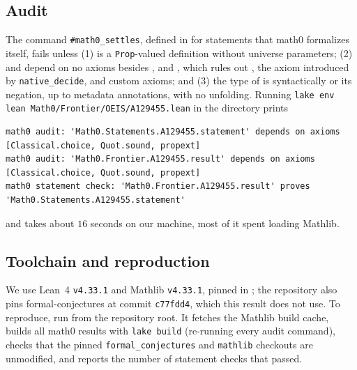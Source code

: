 \documentclass[11pt]{amsart}
\theoremstyle{plain}
\theoremstyle{definition}
\begin{document}
\subsection*{Audit}
The command \texttt{\#math0\_settles}, defined in  for statements that math0 formalizes itself, fails unless (1)  is a \texttt{Prop}-valued definition without universe parameters; (2)  and  depend on no axioms besides ,  and , which rules out , the axiom  introduced by \texttt{native\_decide}, and custom axioms; and (3) the type of  is syntactically  or its negation, up to metadata annotations, with no unfolding. Running \texttt{lake env lean Math0/Frontier/OEIS/A129455.lean} in the directory  prints
\begin{lstlisting}[basicstyle=\ttfamily\scriptsize]
math0 audit: 'Math0.Statements.A129455.statement' depends on axioms [Classical.choice, Quot.sound, propext]
math0 audit: 'Math0.Frontier.A129455.result' depends on axioms [Classical.choice, Quot.sound, propext]
math0 statement check: 'Math0.Frontier.A129455.result' proves 'Math0.Statements.A129455.statement'
\end{lstlisting}
and takes about $16$ seconds on our machine, most of it spent loading Mathlib.

\subsection*{Toolchain and reproduction}
We use Lean~4 \cite{Lean4} \texttt{v4.33.1} and Mathlib \cite{Mathlib} \texttt{v4.33.1}, pinned in ; the repository also pins formal-conjectures \cite{FC} at commit \texttt{c77fdd4}, which this result does not use. To reproduce, run  from the repository root. It fetches the Mathlib build cache, builds all math0 results with \texttt{lake build} (re-running every audit command), checks that the pinned \texttt{formal\_conjectures} and \texttt{mathlib} checkouts are unmodified, and reports the number of statement checks that passed.
\end{document}

